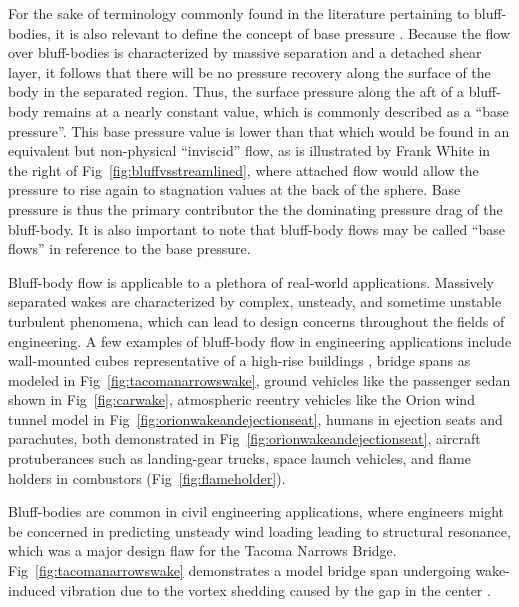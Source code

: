 \documentclass[journal]{new-aiaa}
\begin{document}
For the sake of terminology commonly found in the literature pertaining to bluff-bodies, it is also relevant to define the concept of base pressure \cite{tanner1998theories}. Because the flow over bluff-bodies is characterized by massive separation and a detached shear layer, it follows that there will be no pressure recovery along the surface of the body in the separated region. Thus, the surface pressure along the aft of a bluff-body remains at a nearly constant value, which is commonly described as a ``base pressure''.  This base pressure value is lower than that which would be found in an equivalent but non-physical ``inviscid'' flow, as is illustrated by Frank White in the right of Fig~\ref{fig:bluffvsstreamlined}, where attached flow would allow the pressure to rise again to stagnation values at the back of the sphere.  Base pressure is thus the primary contributor the the dominating pressure drag of the bluff-body. It is also important to note that bluff-body flows may be called ``base flows'' in reference to the base pressure.













Bluff-body flow is applicable to a plethora of real-world applications.  Massively separated wakes are characterized by complex, unsteady, and sometime unstable turbulent phenomena, which can lead to design concerns throughout the fields of engineering. A few examples of bluff-body flow in engineering applications include wall-mounted cubes representative of a high-rise buildings \cite{elkhoury2016assessment}, bridge spans \cite{yuan2017investigation} as modeled in Fig~\ref{fig:tacomanarrowswake}, ground vehicles \cite{mendonca2002towards} like the passenger sedan shown in Fig~\ref{fig:carwake}, atmospheric reentry vehicles \cite{ross2013comprehensive} like the Orion wind tunnel model in Fig~\ref{fig:orionwakeandejectionseat}, humans in ejection seats and parachutes, both demonstrated in Fig~\ref{fig:orionwakeandejectionseat}, aircraft protuberances such as landing-gear trucks, space launch vehicles, and flame holders \cite{tanaka2013bluff} in combustors (Fig~\ref{fig:flameholder}).

Bluff-bodies are common in civil engineering applications, where engineers might be concerned in predicting unsteady wind loading leading to structural resonance, which was a major design flaw for the Tacoma Narrows Bridge.  Fig~\ref{fig:tacomanarrowswake} demonstrates a model bridge span undergoing wake-induced vibration due to the vortex shedding caused by the gap in the center \cite{yuan2017investigation}.
\end{document}
